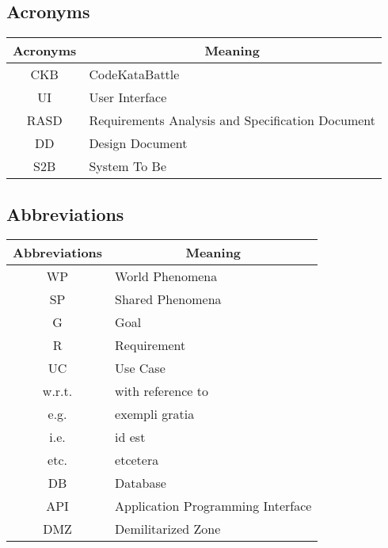 \subsection{Acronyms}
\begin{table}[H]
    \centering
    \begin{tabular}{|c|l|}
    \hline
    \rowcolor[HTML]{B8C8D5} 
    \textbf{Acronyms} & \multicolumn{1}{c|}{\cellcolor[HTML]{B8C8D5}\textbf{Meaning}} \\ \hline
    CKB & CodeKataBattle  \\ \hline
    UI & User Interface  \\ \hline
    RASD & Requirements Analysis and Specification Document  \\ \hline
    DD & Design Document  \\ \hline
    S2B & System To Be \\ \hline
    \end{tabular}
\end{table}

\subsection{Abbreviations}
\begin{table}[H]
    \centering
    \begin{tabular}{|c|l|}
    \hline
    \rowcolor[HTML]{B8C8D5} 
    \textbf{Abbreviations} & \multicolumn{1}{c|}{\cellcolor[HTML]{B8C8D5}\textbf{Meaning}} \\ \hline
    WP & World Phenomena  \\ \hline
    SP & Shared Phenomena \\ \hline
    G  & Goal             \\ \hline
    R  & Requirement             \\ \hline
    UC  & Use Case             \\ \hline
    w.r.t. & with reference to \\ \hline
    e.g. & exempli gratia \\ \hline
    i.e. & id est \\ \hline
    etc. & etcetera \\ \hline
    DB & Database \\ \hline
    API & Application Programming Interface \\ \hline
    DMZ & Demilitarized Zone \\ \hline
    \end{tabular}
\end{table}

